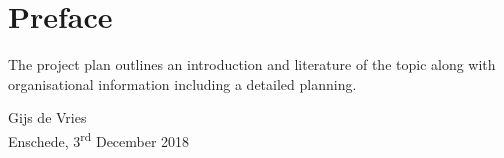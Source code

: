 \chapter*{Preface}

\vskip-10pt
The project plan outlines an introduction and literature of the topic along with organisational information including a detailed planning.

\vskip50pt
Gijs de Vries\\
Enschede, 3\textsuperscript{rd} December 2018
